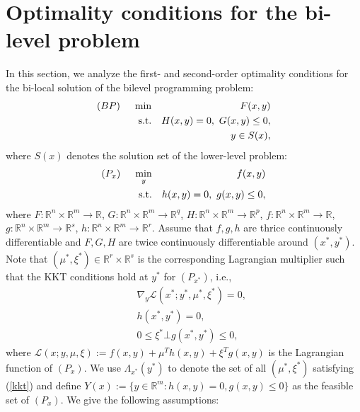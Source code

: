 \documentclass[11pt]{article}
\theoremstyle{definition}
\theoremstyle{remark}
\numberwithin{equation}{section}
\begin{document}
\section{Optimality conditions for the bi-level problem}\label{section 4}
In this section, we analyze the first-  and  second-order optimality conditions for the bi-local solution of the bilevel programming problem:
\begin{eqnarray*}
(BP)~~~~\min && F(x,y)\\
{\rm s.t.}&& H(x,y)= 0,\ G(x,y)\le 0,\\
&& y\in S(x),
\end{eqnarray*}
where $ S(x)$ denotes the solution set of the lower-level problem:
\begin{eqnarray*}
(P_x)~~~~\min_y && f(x,y)\\
{\rm s.t.} &&
h(x,y)= 0,\  g(x,y)\le 0,
\end{eqnarray*}
where  $F:\mathbb{R}^n \times \mathbb{R}^m \to \mathbb{R} $, $G :\mathbb{R}^n\times \mathbb{R}^m\to \mathbb{R}^q $, $H :\mathbb{R}^n\times \mathbb{R}^m\to \mathbb{R}^p $,
$f:\mathbb{R}^n \times \mathbb{R}^m \to \mathbb{R} $,  $g :\mathbb{R}^n\times \mathbb{R}^m\to \mathbb{R}^s $, $h :\mathbb{R}^n\times \mathbb{R}^m\to \mathbb{R}^r $.
Assume that $f, g, h$ are
 thrice continuously differentiable  and $F, G, H$ are twice continuously
differentiable around $(x^*,y^*)$.
Note that $(\mu^*,\xi^*)\in \mathbb{R}^r\times\mathbb{R}^s$ is the corresponding Lagrangian multiplier such that
the KKT conditions hold at $y^*$ for  $(P_{x^*})$, i.e.,
 \begin{eqnarray}\label{kkt}
 && \nabla_y \mathcal{L}\left(x^*; y^*, \mu^*,\xi^*\right)=0,\nonumber \\
&& h\left(x^*, y^*\right)=0,\\
&& 0\le \xi^*\bot g(x^*,y^*)\leq 0,\nonumber
\end{eqnarray}
where  $\mathcal{L}(x;y,\mu,\xi):=f(x,y)+\mu^Th(x,y)+\xi^Tg(x,y)$ is the Lagrangian function of $(P_x)$. We use $\Lambda_{x^*}(y^*)$ to denote the
set of all $(\mu^*,\xi^*)$ satisfying (\ref{kkt}) and
define $Y(x):=\{y\in \mathbb{R}^m: h(x,y)=0, g(x,y)\le0\}$ as the feasible set of $(P_x)$.
We give the following assumptions:
\end{document}

